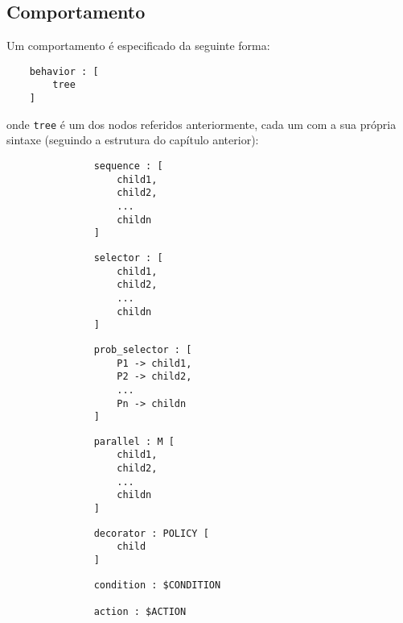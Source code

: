 \subsection{Comportamento}
Um comportamento é especificado da seguinte forma:
\begin{lstlisting}
    behavior : [
        tree
    ]
\end{lstlisting}
onde \texttt{tree} é um dos nodos referidos anteriormente, cada um com a sua própria sintaxe (seguindo a estrutura do capítulo anterior):
\begin{figure}[H]
\centering
\begin{subfigure}{0.45\linewidth}
\begin{lstlisting}
    sequence : [
        child1,
        child2,
        ...
        childn
    ]
\end{lstlisting}
\end{subfigure}
\hfil
\begin{subfigure}{0.45\linewidth}
\begin{lstlisting}
    selector : [
        child1,
        child2,
        ...
        childn
    ]
\end{lstlisting}
\end{subfigure}
\end{figure}
\begin{figure}[H]
\begin{subfigure}{0.45\linewidth}
\begin{lstlisting}
    prob_selector : [
        P1 -> child1,
        P2 -> child2,
        ...
        Pn -> childn
    ]
\end{lstlisting}
\end{subfigure}
\hfil
\begin{subfigure}{0.45\linewidth}
\begin{lstlisting}
    parallel : M [
        child1,
        child2,
        ...
        childn
    ]
\end{lstlisting}
\end{subfigure}
\begin{subfigure}{0.45\linewidth}
\begin{lstlisting}
    decorator : POLICY [
        child
    ]
\end{lstlisting}
\end{subfigure}
\begin{subfigure}{0.45\linewidth}
\begin{lstlisting}
    condition : $CONDITION

    action : $ACTION
\end{lstlisting}
\end{subfigure}
\end{figure}

